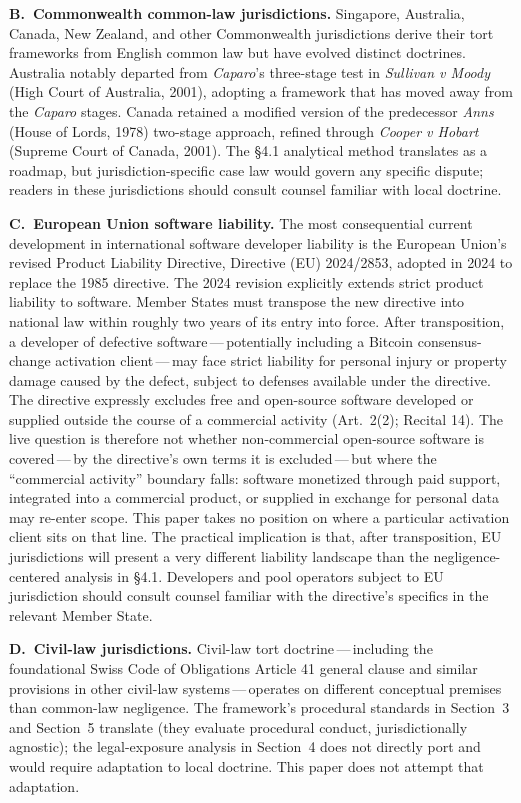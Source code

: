 \documentclass[11pt, twoside, openright]{book}
\newcommand{\reqitem}[2]{\medskip\noindent\textbf{#1\ #2}\quad\ignorespaces}
\newcommand{\sect}[1]{\S#1}
\begin{document}
\reqitem{B.}{Commonwealth common-law jurisdictions.} Singapore, Australia, Canada, New Zealand, and other Commonwealth jurisdictions derive their tort frameworks from English common law but have evolved distinct doctrines. Australia notably departed from \textit{Caparo}'s three-stage test in \textit{Sullivan v Moody} (High Court of Australia, 2001), adopting a framework that has moved away from the \textit{Caparo} stages. Canada retained a modified version of the predecessor \textit{Anns} (House of Lords, 1978) two-stage approach, refined through \textit{Cooper v Hobart} (Supreme Court of Canada, 2001). The \sect{4.1} analytical method translates as a roadmap, but jurisdiction-specific case law would govern any specific dispute; readers in these jurisdictions should consult counsel familiar with local doctrine.

\reqitem{C.}{European Union software liability.} The most consequential current development in international software developer liability is the European Union's revised Product Liability Directive, Directive (EU) 2024/2853, adopted in 2024 to replace the 1985 directive. The 2024 revision explicitly extends strict product liability to software. Member States must transpose the new directive into national law within roughly two years of its entry into force. After transposition, a developer of defective software\,---\,potentially including a Bitcoin consensus-change activation client\,---\,may face strict liability for personal injury or property damage caused by the defect, subject to defenses available under the directive. The directive expressly excludes free and open-source software developed or supplied outside the course of a commercial activity (Art.~2(2); Recital 14). The live question is therefore not whether non-commercial open-source software is covered\,---\,by the directive's own terms it is excluded\,---\,but where the ``commercial activity'' boundary falls: software monetized through paid support, integrated into a commercial product, or supplied in exchange for personal data may re-enter scope. This paper takes no position on where a particular activation client sits on that line. The practical implication is that, after transposition, EU jurisdictions will present a very different liability landscape than the negligence-centered analysis in \sect{4.1}. Developers and pool operators subject to EU jurisdiction should consult counsel familiar with the directive's specifics in the relevant Member State.

\reqitem{D.}{Civil-law jurisdictions.} Civil-law tort doctrine\,---\,including the foundational Swiss Code of Obligations Article 41 general clause and similar provisions in other civil-law systems\,---\,operates on different conceptual premises than common-law negligence. The framework's procedural standards in Section~3 and Section~5 translate (they evaluate procedural conduct, jurisdictionally agnostic); the legal-exposure analysis in Section~4 does not directly port and would require adaptation to local doctrine. This paper does not attempt that adaptation.
\end{document}
